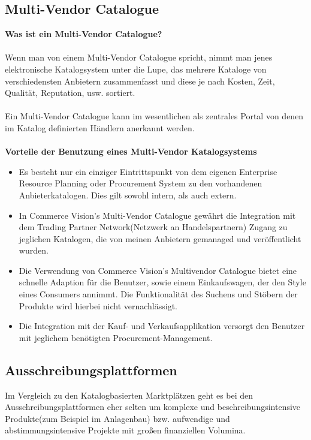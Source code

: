 \documentclass[11pt,a4paper]{article}
\begin{document}
\subsection{Multi-Vendor Catalogue}

\textbf{Was ist ein Multi-Vendor Catalogue?} \\ \\
\noindent Wenn man von einem Multi-Vendor Catalogue spricht, nimmt man jenes elektronische Katalogsystem unter die Lupe, das mehrere Kataloge von verschiedensten Anbietern zusammenfasst und diese je nach Kosten, Zeit, Qualität, Reputation, usw. sortiert. \\ \\
Ein Multi-Vendor Catalogue kann im wesentlichen als zentrales Portal von denen im Katalog definierten Händlern anerkannt werden. \\ \\

\noindent \textbf{Vorteile der Benutzung eines Multi-Vendor Katalogsystems}
\begin{itemize}
	\item Es besteht nur ein einziger Eintrittspunkt von dem eigenen Enterprise Resource Planning oder Procurement System zu den vorhandenen Anbieterkatalogen. Dies gilt sowohl intern, als auch extern.
	\item In Commerce Vision's Multi-Vendor Catalogue gewährt die Integration mit dem Trading Partner Network(Netzwerk an Handelspartnern) Zugang zu jeglichen Katalogen, die von meinen Anbietern gemanaged und veröffentlicht wurden.
	\item Die Verwendung von Commerce Vision's Multivendor Catalogue bietet eine schnelle Adaption für die Benutzer, sowie einem Einkaufswagen, der den Style eines Consumers annimmt. Die Funktionalität des Suchens und Stöbern der Produkte wird hierbei nicht vernachlässigt.
	\item Die Integration mit der Kauf- und Verkaufsapplikation versorgt den Benutzer mit jeglichem benötigten Procurement-Management.
\end{itemize}

\newpage
\subsection{Ausschreibungsplattformen}

Im Vergleich zu den Katalogbasierten Marktplätzen geht es bei den Ausschreibungsplattformen eher selten um komplexe und beschreibungsintensive Produkte(zum Beispiel im Anlagenbau) bzw. aufwendige und abstimmungsintensive Projekte mit großen finanziellen Volumina. 
\end{document}
